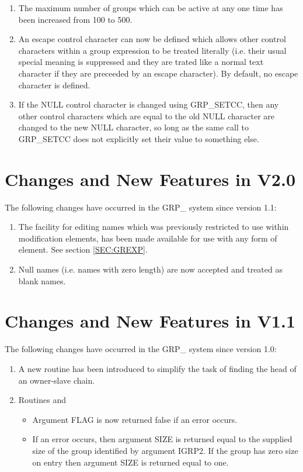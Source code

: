\begin{enumerate}

\item The maximum number of groups which can be active at any one time
has been increased from 100 to 500.

\item An escape control character can now be defined which allows other
control characters within a group expression to be treated literally 
(i.e. their usual special meaning is suppressed and they are trated like a 
normal text character if they are preceeded by an escape character). By 
default, no escape character is defined.

\item If the NULL control character is changed using GRP\_SETCC, then any
other control characters which are equal to the old NULL character are
changed to the new NULL character, so long as the same call to GRP\_SETCC
does not explicitly set their value to something else.

\end{enumerate}

\section{Changes and New Features in V2.0}
The following changes have occurred in the GRP\_ system since version 1.1:
\begin{enumerate}
\item The facility for editing names which was previously restricted to use
within modification elements, has been made available for use with any form
of element. See section \ref{SEC:GREXP}.
\item Null names (i.e. names with zero length) are now accepted and treated as
blank names.
\end{enumerate}

\section{Changes and New Features in V1.1}
The following changes have occurred in the GRP\_ system since version 1.0:
\begin{enumerate}
\item A new routine  has been introduced to simplify the task of
finding the head of an owner-slave chain.
\item Routines  and 
\begin{itemize}
\item Argument FLAG is now returned false if an error occurs.
\item If an error occurs, then argument SIZE is returned equal to the supplied
size of the group identified by argument IGRP2. If the group has zero size on
entry then argument SIZE is returned equal to one.
\end{itemize}
\end{enumerate}


